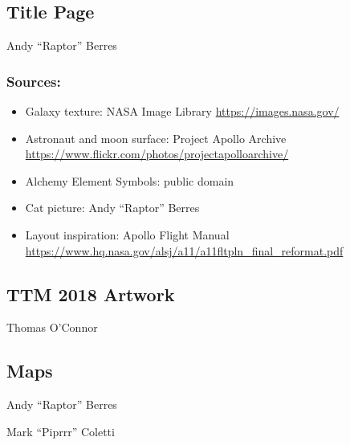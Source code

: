 \begin{multicols}{2}
\subsection*{Title Page} 
Andy ``Raptor'' Berres

\subsubsection*{Sources:}
\begin{itemize}[noitemsep]
  \item Galaxy texture: NASA Image Library \url{https://images.nasa.gov/}
  \item Astronaut and moon surface: Project Apollo Archive \url{https://www.flickr.com/photos/projectapolloarchive/}
  \item Alchemy Element Symbols: public domain
  \item Cat picture: Andy ``Raptor'' Berres
  \item Layout inspiration: Apollo Flight Manual \url{https://www.hq.nasa.gov/alsj/a11/a11fltpln_final_reformat.pdf}
\end{itemize}
\vfill\null

\subsection*{TTM 2018 Artwork}
Thomas O'Connor

\subsection*{Maps}
\begin{description}[leftmargin=6em,noitemsep,style=nextline]
	\item[Direction maps:] Andy ``Raptor'' Berres
	\item[Inside back cover map:] Mark ``Piprrr'' Coletti
\end{description}

\columnbreak




\end{multicols}
